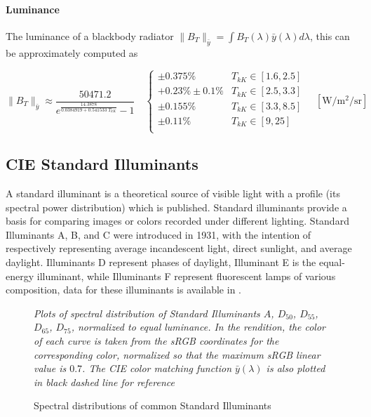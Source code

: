 \paragraph{Luminance}

The luminance of a blackbody radiator $\|B_T\|_{\bar y} = \int B_T(\lambda)\bar y(\lambda) d\lambda$,
this can be approximately computed as

\begin{equation}
\|B_T\|_{\bar y} \approx \frac{50471.2}{e^{\frac{14.3878}{0.0384919 +
0.541533\; T_{kK}}}-1}
\quad \left\{\begin{array}{cl}
\pm 0.375\% & T_{kK} \in [1.6, 2.5] \\
+0.23\% \pm 0.1\% & T_{kK} \in [2.5, 3.3] \\
\pm 0.155\% & T_{kK} \in [3.3, 8.5] \\
\pm 0.11\%  & T_{kK} \in [9, 25] \\
\end{array}\right.
\quad \left[\unit{\watt\per\square\meter\per\steradian}\right]
\end{equation}


\subsection{CIE Standard Illuminants}

A standard illuminant is a theoretical source of visible light with a profile
(its spectral
power distribution) which is published. Standard illuminants provide a basis for
comparing
images or colors recorded under different lighting. Standard Illuminants A, B,
and C were
introduced in 1931, with the intention of respectively representing average
incandescent light,
direct sunlight, and average daylight. Illuminants D represent phases of
daylight, Illuminant E
is the equal-energy illuminant, while Illuminants F represent fluorescent lamps
of various
composition, data for these illuminants is available in \cite{stdilluminants}.

\begin{figure}
{
\small
\centering
\resizebox{\linewidth}{!}{}
\caption{Spectral distributions of common Standard Illuminants}
\label{fig:illumspectra}
}
\vskip 1mm
{\footnotesize\it Plots of spectral distribution of
Standard Illuminants $A$, $D_{50}$, $D_{55}$, $D_{65}$, $D_{75}$,
normalized to equal luminance.
In the rendition, the color of each curve is taken from the
sRGB coordinates for the corresponding color,
normalized so that the maximum sRGB linear value is $0.7$.
The CIE color matching function $\bar y (\lambda)$ is also plotted in
black dashed line for reference}
\end{figure}

